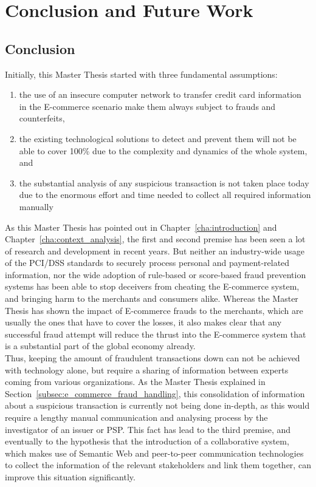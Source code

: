
\chapter{Conclusion and Future Work} %
\label{cha:conclusion}

\section{Conclusion}
\label{sec:conclusion}

Initially, this Master Thesis started with three fundamental assumptions: \@

\begin{enumerate}
	\item the use of an insecure computer network to transfer credit card information in the \gls{E-commerce} scenario make them always subject to frauds and counterfeits,
	\item the existing technological solutions to detect and prevent them will not be able to cover 100\% due to the complexity and dynamics of the whole system, and
	\item the substantial analysis of any suspicious transaction is not taken place today due to the enormous effort and time needed to collect all required information manually
\end{enumerate}

As this Master Thesis has pointed out in Chapter~\ref{cha:introduction} and Chapter~\ref{cha:context_analysis}, the first and second premise has been seen a lot of research and development in recent years. But neither an industry-wide usage of the \gls{PCI/DSS} standards to securely process personal and payment-related information, nor the wide adoption of rule-based or score-based fraud prevention systems has been able to stop deceivers from cheating the \gls{E-commerce} system, and bringing harm to the merchants and consumers alike. Whereas the Master Thesis has shown the impact of \gls{E-commerce} frauds to the merchants, which are usually the ones that have to cover the losses, it also makes clear that any successful fraud attempt will reduce the thrust into the \gls{E-commerce} system that is a substantial part of the global economy already. \\

Thus, keeping the amount of fraudulent transactions down can not be achieved with technology alone, but require a sharing of information between experts coming from various organizations. As the Master Thesis explained in Section~\ref{subsec:e_commerce_fraud_handling}, this consolidation of information about a suspicious transaction is currently not being done in-depth, as this would require a lengthy manual communication and analysing process by the investigator of an issuer or \gls{PSP}. This fact has lead to the third premise, and eventually to the hypothesis that the introduction of a collaborative system, which makes use of Semantic Web and peer-to-peer communication technologies to collect the information of the relevant stakeholders and link them together, can improve this situation significantly. \\

